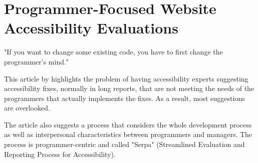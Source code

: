 \iffalse

    \section{Programmer-Focused Website Accessibility Evaluations}
    \begin{displayquote}
    "If you want to change some existing code, you have to first change the programmer's mind."
    \end{displayquote}
    
    
    
    This article by \textcite{Law:ProgrammerFocusedWebsiteAccessibilityEvaluations:2005} highlights the problem of having accessibility experts suggesting accessibility fixes, normally in long reports, that are not meeting the needs of the programmers that actually implements the fixes. As a result, most suggestions are overlooked. 
        
    The article also suggests a process that considers the whole development process as well as interpersonal characteristics between programmers and managers. The process is programmer-centric and called "Serpa" (Streamlined Evaluation and Reporting Process for Accessibility).
    

